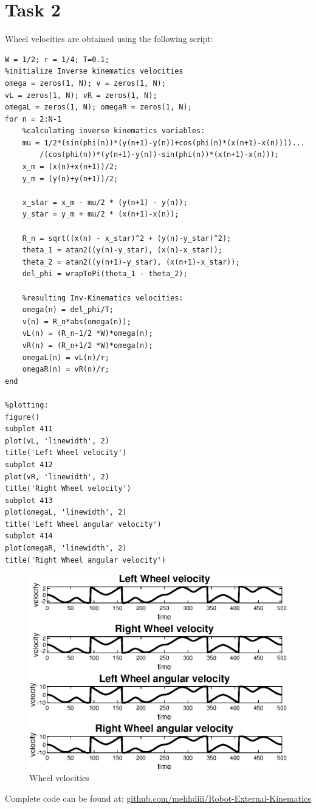 \documentclass[12pt,letterpaper]{article}
\begin{document}
\section*{Task 2}
Wheel velocities are obtained using the following script: 
\begin{lstlisting}
W = 1/2; r = 1/4; T=0.1; 
%initialize Inverse kinematics velocities
omega = zeros(1, N); v = zeros(1, N); 
vL = zeros(1, N); vR = zeros(1, N); 
omegaL = zeros(1, N); omegaR = zeros(1, N); 
for n = 2:N-1
    %calculating inverse kinematics variables: 
    mu = 1/2*(sin(phi(n))*(y(n+1)-y(n))+cos(phi(n)*(x(n+1)-x(n))))...
        /(cos(phi(n))*(y(n+1)-y(n))-sin(phi(n))*(x(n+1)-x(n))); 
    x_m = (x(n)+x(n+1))/2; 
    y_m = (y(n)+y(n+1))/2; 
    
    x_star = x_m - mu/2 * (y(n+1) - y(n)); 
    y_star = y_m + mu/2 * (x(n+1)-x(n)); 
    
    R_n = sqrt((x(n) - x_star)^2 + (y(n)-y_star)^2); 
    theta_1 = atan2((y(n)-y_star), (x(n)-x_star)); 
    theta_2 = atan2((y(n+1)-y_star), (x(n+1)-x_star)); 
    del_phi = wrapToPi(theta_1 - theta_2); 
    
    %resulting Inv-Kinematics velocities: 
    omega(n) = del_phi/T; 
    v(n) = R_n*abs(omega(n));  
    vL(n) = (R_n-1/2 *W)*omega(n); 
    vR(n) = (R_n+1/2 *W)*omega(n); 
    omegaL(n) = vL(n)/r; 
    omegaR(n) = vR(n)/r; 
end

%plotting: 
figure()
subplot 411
plot(vL, 'linewidth', 2)
title('Left Wheel velocity')
subplot 412
plot(vR, 'linewidth', 2)
title('Right Wheel velocity')
subplot 413
plot(omegaL, 'linewidth', 2)
title('Left Wheel angular velocity')
subplot 414
plot(omegaR, 'linewidth', 2)
title('Right Wheel angular velocity')
\end{lstlisting}
\begin{figure} [h]
    \centering
    \includegraphics[]{figures/task2.eps}
    \caption{Wheel velocities}
    \label{fig:my_label}
\end{figure}
Complete code can be found at: \href{https://github.com/mehhdiii/Robot-External-Kinematics}{github.com/mehhdiii/Robot-External-Kinematics}
\end{document}
